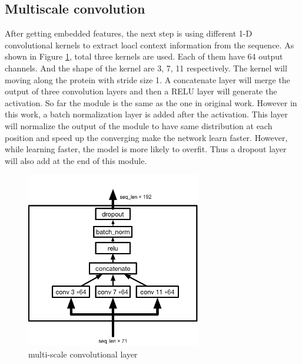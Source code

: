 \subsection{Multiscale convolution}
After getting embedded features, the next step is using different 1-D convolutional kernels to extract loacl context information from the sequence. As shown in Figure \ref{fig:multi_conv}, total three kernels are used. Each of them have 64 output channels. And the shape of the kernel are 3, 7, 11 respectively. The kernel will moving along the protein with stride size 1. A concatenate layer will merge the output of three convolution layers and then a RELU layer will generate the activation. So far the module is the same as the one in original work. However in this work, a batch normalization layer is added after the activation. This layer will normalize the output of the module to have same distribution at each position and speed up the converging make the network learn faster. However, while learning faster, the model is more likely to overfit. Thus a dropout layer will also add at the end of this module.\par
\begin{figure}[H] 
	\centering
	\includegraphics[width=3in]{Figures/multiscale_conv}
	\caption[multi-scale convolutional layer]{multi-scale convolutional layer}
	\label{fig:multi_conv}
\end{figure}

